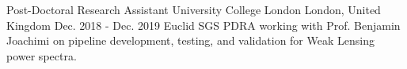 \begin{cventries}
  \cventry
    {Post-Doctoral Research Assistant} %
    {University College London} %
    {London, United Kingdom} %
    {Dec. 2018 - Dec. 2019} %
    {
    Euclid SGS PDRA working with Prof. Benjamin Joachimi on pipeline development, testing, and validation for Weak Lensing power spectra.
    }


\end{cventries}

